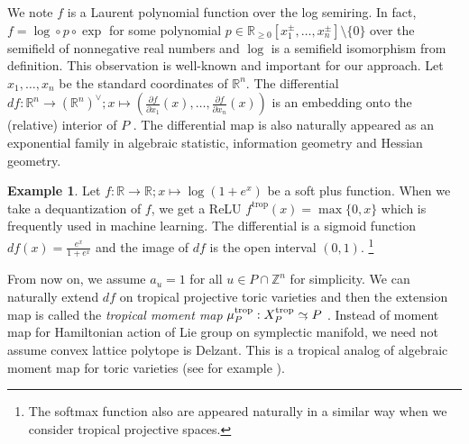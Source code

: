 \documentclass[a4paper,dvipdfmx,reqno,12pt]{amsart}
\theoremstyle{definition}
\newtheorem{example}[theorem]{Example}
\newcommand{\opn}[1]{\operatorname{#1}}
\newcommand{\myfootnote}[1]{\hspace{-5pt}\footnote{#1}}
\newcommand{\simto}{ 
\mathrel{\raisebox{0.13em}{${\sim}$}}
\kern -0.75em \mathrel{\raisebox{-0.11em}{${\scriptstyle \to}$}}  
}
\numberwithin{equation}{section}
\begin{document}
We note $f$ is a Laurent polynomial function over the 
log semiring. 
In fact, $f=\opn{log}\circ p\circ \opn{exp}$ 
for some polynomial 
$p\in \mathbb{R}_{\geq 0}[x_1^{\pm},\ldots,x_n^{\pm}]
\setminus \{0\}$ over the semifield of nonnegative
real numbers and $\opn{log}$ is a semifield isomorphism
from definition.
This observation is well-known and important 
for our approach.
Let $x_1,\ldots,x_n$ be the standard coordinates of 
$\mathbb{R}^{n}$.
The differential
$df:{\mathbb{R}}^{n}\to ({\mathbb{R}}^{n})^{\vee}; x\mapsto 
(\frac{\partial f}{\partial x_1}(x),\ldots,\frac{\partial f}{\partial x_n}(x))$ 
is an embedding onto the (relative) interior of $P$
\cite[p.124 Exercise]{MR1301331}. 
The differential map is also naturally appeared as an 
exponential family in algebraic statistic,
information geometry and Hessian geometry.
\begin{example}
Let $f\colon \mathbb{R} \to {\mathbb{R}}; x\mapsto \log (1+e^{x})$ be a soft 
plus function. When we take a dequantization of $f$,
we get a ReLU $f^{\opn{trop}}(x)=\max\{0,x\}$ which 
is frequently used in machine learning.
The differential is a sigmoid function 
$df(x)=\frac{e^{x}}{1+e^{x}}$ and 
the image of $df$ is the open interval $(0,1)$.
\myfootnote{
The softmax function also are appeared 
naturally in a similar way 
when we consider tropical projective spaces.}
\end{example}

From now on, we assume 
$a_u=1$ for all $u\in P\cap \mathbb{Z}^{n}$ for simplicity.
We can naturally extend $df$ on tropical projective toric 
varieties and then the extension map is called the \emph{tropical moment map}
$\mu_{P}^{\opn{trop}}: X_{P}^{\opn{trop}}\simto P$ 
\cite[Definition 2.1 (2)]{MR2428356}.
Instead of moment map for Hamiltonian action of Lie group on
symplectic manifold, we
need not assume convex lattice polytope is Delzant.
This is a tropical analog of algebraic moment map 
for toric varieties
(see for example
\cite[]{MR2810322}).
\end{document}
